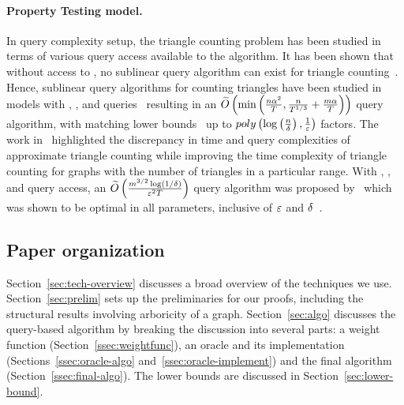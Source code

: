 \paragraph{Property Testing model.}
In query complexity setup, the triangle counting problem has been studied in terms of various query access available to the algorithm. It has been shown that without access to \edgeexistsq{}, no sublinear query algorithm can exist for triangle counting~\citep{GRS11}. Hence, sublinear query algorithms for counting triangles have been studied in models with \degreeq{}, \neighbourq{}, and \edgeexistsq{} queries~\citep{Dana_Ron_Triangle_Counting,DBLP:conf/soda/EdenRS20} resulting in an $\widetilde{O}\left({{\min\left({\frac{n\alpha^2}{T},\frac{n}{T^{1/3}}+\frac{m\alpha}{T}}\right)}}\right)$ query algorithm, with matching lower bounds~\citep{Dana_Ron_Triangle_Counting,DBLP:conf/approx/EdenR18,DBLP:conf/soda/EdenRS20} up to $poly\left({\log\left({\frac{n}{\delta}}\right),\frac{1}{\varepsilon}}\right)$ factors. The work in~\citep{tetek:LIPIcs.ICALP.2022.107} highlighted the discrepancy in time and query complexities of approximate triangle counting while improving the time complexity of triangle counting for graphs with the number of triangles in a particular range. With \randedgeq{}, \neighbourq{}, and \edgeexistsq{} query access, an $\widetilde{O}\left({{\frac{m^{3/2}\log\left({1/\delta}\right)}{\varepsilon^2T}}}\right)$ query algorithm was proposed by~\citep{assadi2018simple} which was shown to be optimal in all parameters, inclusive of $\varepsilon$ and $\delta$~\citep{DBLP:conf/approx/AssadiN22}. 

\subsection{Paper organization}
Section~\ref{sec:tech-overview} discusses a broad overview of the techniques we use. Section~\ref{sec:prelim} sets up the preliminaries for our proofs, including the structural results involving arboricity of a graph. Section~\ref{sec:algo} discusses the query-based algorithm by breaking the discussion into several parts: a weight function (Section~\ref{ssec:weightfunc}), an oracle and its implementation (Sections~\ref{ssec:oracle-algo} and~\ref{ssec:oracle-implement}) and the final algorithm (Section~\ref{ssec:final-algo}). The lower bounds are discussed in Section~\ref{sec:lower-bound}. 














